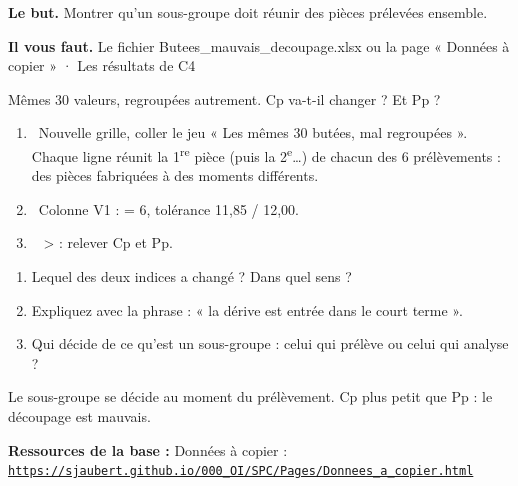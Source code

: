 \documentclass[10pt,a4paper]{article}
\begin{document}
\thispagestyle{fancy}
\begin{tcolorbox}[boite]\textbf{Le but.} Montrer qu'un sous-groupe doit réunir des pièces prélevées ensemble.\par\textbf{Il vous faut.} Le fichier Butees\_mauvais\_decoupage.xlsx ou la page « Données à copier » · Les résultats de C4\end{tcolorbox}
\begin{tcolorbox}[pred]Mêmes 30 valeurs, regroupées autrement. Cp va-t-il changer ? Et Pp ?\reponse\end{tcolorbox}
\begin{enumerate}[label=\textcolor{cyan}{\textbf{\arabic*.}},leftmargin=15pt,itemsep=1.5pt]
\item \tagE\ Nouvelle grille, coller le jeu « Les mêmes 30 butées, mal regroupées ». Chaque ligne réunit la 1\textsuperscript{re} pièce (puis la 2\textsuperscript{e}…) de chacun des 6 prélèvements : des pièces fabriquées à des moments différents.
\item \tagE\ Colonne V1 :  = 6, tolérance 11,85 / 12,00.
\item \tagE\  >  : relever Cp et Pp.
\end{enumerate}
\par
{}
\begin{enumerate}[label=\textcolor{cyan}{\textbf{Q\arabic*.}},leftmargin=22pt]
\item Lequel des deux indices a changé ? Dans quel sens ?\reponse[1]
\item Expliquez avec la phrase : « la dérive est entrée dans le court terme ».\reponse[2]
\item Qui décide de ce qu'est un sous-groupe : celui qui prélève ou celui qui analyse ?\reponse[1]
\end{enumerate}
\begin{tcolorbox}[retenir]Le sous-groupe se décide au moment du prélèvement. Cp plus petit que Pp : le découpage est mauvais.\end{tcolorbox}
\vfill{\footnotesize\color{uimm}\textbf{Ressources de la base :} Données à copier : \href{https://sjaubert.github.io/000_OI/SPC/Pages/Donnees_a_copier.html\#decoupage}{\nolinkurl{https://sjaubert.github.io/000_OI/SPC/Pages/Donnees_a_copier.html}}}
\end{document}
